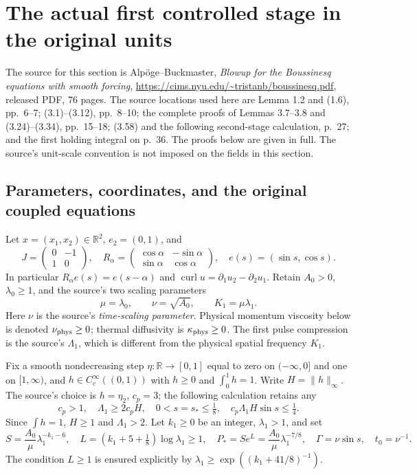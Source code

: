 \section{The actual first controlled stage in the original units}
\label{sec:cv-first-stage}

The source for this section is Alp\"oge--Buckmaster,
\emph{Blowup for the Boussinesq equations with smooth forcing},
\url{https://cims.nyu.edu/~tristanb/boussinesq.pdf}, released PDF,
76 pages. The source locations used here are Lemma 1.2 and (1.6),
pp.~6--7; (3.1)--(3.12), pp.~8--10; the complete proofs of
Lemmas 3.7--3.8 and (3.24)--(3.34), pp.~15--18;
(3.58) and the following second-stage calculation, p.~27; and
the first holding integral on p.~36. The proofs below are given in
full. The source's unit-scale convention is not imposed on the fields
in this section.

\subsection{Parameters, coordinates, and the original coupled equations}

Let $x=(x_1,x_2)\in\mathbb R^2$, $e_2=(0,1)$, and
\[
 J=\begin{pmatrix}0&-1\\1&0\end{pmatrix},\quad
 R_\alpha=\begin{pmatrix}\cos\alpha&-\sin\alpha\\
 \sin\alpha&\cos\alpha\end{pmatrix},\quad
 e(s)=(\sin s,\cos s).
\]
In particular $R_\alpha e(s)=e(s-\alpha)$ and
$\operatorname{curl}u=\partial_1u_2-\partial_2u_1$.
Retain $A_0>0$, $\lambda_0\geq1$, and the source's two scaling parameters
\[
 \mu=\lambda_0,\qquad \nu=\sqrt{A_0},\qquad K_1=\mu\lambda_1.
\]
Here $\nu$ is the source's \emph{time-scaling parameter}.
Physical momentum viscosity below is denoted $\nu_{\rm phys}\geq0$;
thermal diffusivity is $\kappa_{\rm phys}\geq0$.
The first pulse compression is the source's $\Lambda_1$, which is
different from the physical spatial frequency $K_1$.

Fix a smooth nondecreasing step $\eta:\mathbb R\to[0,1]$ equal to zero
on $(-\infty,0]$ and one on $[1,\infty)$, and
$h\in C_c^\infty((0,1))$ with $h\geq0$ and $\int_0^1h=1$.
Write $H=\|h\|_\infty$. The source's choice is $h=\eta_2$,
$c_p=3$; the following calculation retains any
\begin{equation}
 c_p>1,\quad \Lambda_1\geq2c_pH,\quad
 0<s=s_*\leq\tfrac18,\quad c_p\Lambda_1H\sin s\leq\tfrac14.
 \label{eq:cv-first-design}
\end{equation}
Since $\int h=1$, $H\geq1$ and $\Lambda_1>2$.
Let $k_1\geq0$ be an integer, $\lambda_1>1$, and set
\begin{equation}
 S=\frac{A_0}{\mu}\lambda_1^{-k_1-6},\quad
 L=(k_1+5+\tfrac18)\log\lambda_1\geq1,\quad
 P_* =S e^L=\frac{A_0}{\mu}\lambda_1^{-7/8},\quad
 \Gamma=\nu\sin s,\quad t_0=\nu^{-1}.
 \label{eq:cv-first-seed}
\end{equation}
The condition $L\geq1$ is ensured explicitly by
$\lambda_1\geq\exp((k_1+41/8)^{-1})$.

